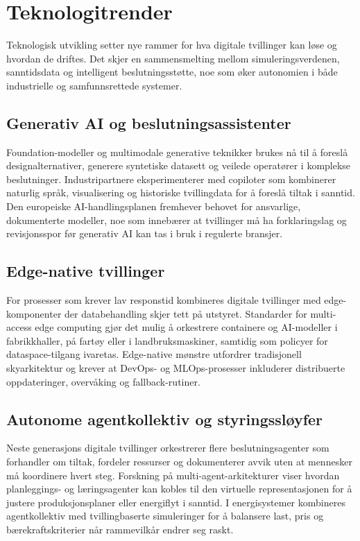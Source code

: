 \section{Teknologitrender}
Teknologisk utvikling setter nye rammer for hva digitale tvillinger kan løse og hvordan de driftes. Det skjer en sammensmelting mellom simuleringsverdenen, sanntidsdata og intelligent beslutningsstøtte, noe som øker autonomien i både industrielle og samfunnsrettede systemer.

\subsection{Generativ AI og beslutningsassistenter}
Foundation-modeller og multimodale generative teknikker brukes nå til å foreslå designalternativer, generere syntetiske datasett og veilede operatører i komplekse beslutninger. Industripartnere eksperimenterer med copiloter som kombinerer naturlig språk, visualisering og historiske tvillingdata for å foreslå tiltak i sanntid.\citep{siemens2023copilot} Den europeiske AI-handlingsplanen fremhever behovet for ansvarlige, dokumenterte modeller, noe som innebærer at tvillinger må ha forklaringslag og revisjonsspor før generativ AI kan tas i bruk i regulerte bransjer.\citep{eu2023ai}

\subsection{Edge-native tvillinger}
For prosesser som krever lav responstid kombineres digitale tvillinger med edge-komponenter der databehandling skjer tett på utstyret. Standarder for multi-access edge computing gjør det mulig å orkestrere containere og AI-modeller i fabrikkhaller, på fartøy eller i landbruksmaskiner, samtidig som policyer for dataspace-tilgang ivaretas.\citep{etsi2023mec} Edge-native mønstre utfordrer tradisjonell skyarkitektur og krever at DevOps- og MLOps-prosesser inkluderer distribuerte oppdateringer, overvåking og fallback-rutiner.

\subsection{Autonome agentkollektiv og styringssløyfer}
Neste generasjons digitale tvillinger orkestrerer flere beslutningsagenter som forhandler om tiltak, fordeler ressurser og dokumenterer avvik uten at mennesker må koordinere hvert steg. Forskning på multi-agent-arkitekturer viser hvordan planleggings- og læringsagenter kan kobles til den virtuelle representasjonen for å justere produksjonsplaner eller energiflyt i sanntid.\citep{xu2023multiagent} I energisystemer kombineres agentkollektiv med tvillingbaserte simuleringer for å balansere last, pris og bærekraftskriterier når rammevilkår endrer seg raskt.\citep{li2023multiagenttwins}

